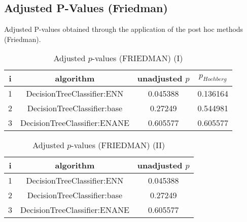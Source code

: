 \documentclass[a4paper,10pt]{article}
\begin{document}
\begin{landscape}
\section{Adjusted P-Values (Friedman)}


Adjusted P-values obtained through the application of the post hoc methods (Friedman).

\begin{table}[!htp]
\centering\small
\begin{tabular}{cccc}
i&algorithm&unadjusted $p$&$p_{Hochberg}$\\
\hline1&DecisionTreeClassifier:ENN&0.045388&0.136164\\2&DecisionTreeClassifier:base&0.27249&0.544981\\3&DecisionTreeClassifier:ENANE&0.605577&0.605577\\\hline
\end{tabular}
\caption{Adjusted $p$-values (FRIEDMAN) (I)}
\end{table}
\begin{table}[!htp]
\centering\small
\begin{tabular}{ccc}
i&algorithm&unadjusted $p$\\
\hline1&DecisionTreeClassifier:ENN&0.045388\\2&DecisionTreeClassifier:base&0.27249\\3&DecisionTreeClassifier:ENANE&0.605577\\\hline
\end{tabular}
\caption{Adjusted $p$-values (FRIEDMAN) (II)}
\end{table}

\newpage
\end{landscape}
\end{document}
